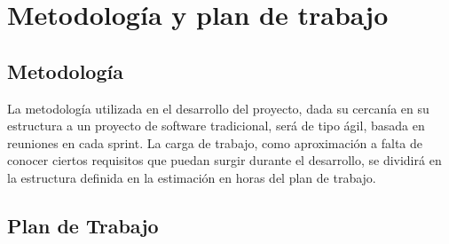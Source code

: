 \section{Metodología y plan de trabajo}
\subsection{Metodología}
La metodología utilizada en el desarrollo del proyecto, dada su cercanía en su estructura a un proyecto de software tradicional, será de tipo ágil, basada en reuniones en cada sprint.
La carga de trabajo, como aproximación a falta de conocer ciertos requisitos que puedan surgir durante el desarrollo, se dividirá en la estructura definida en la estimación en horas del plan de trabajo.

\subsection{Plan de Trabajo}

